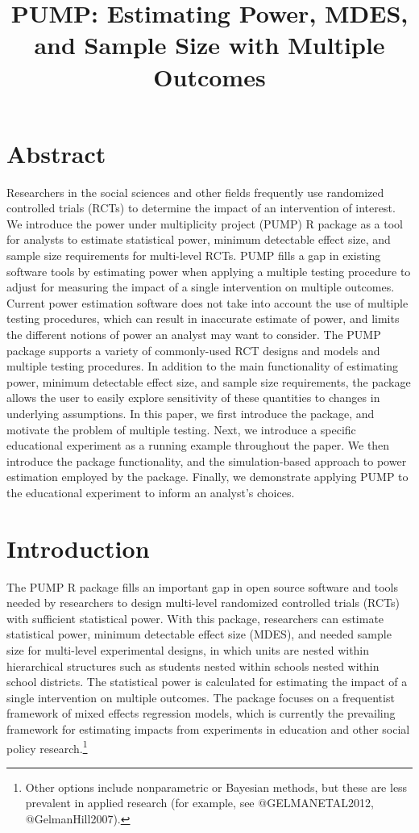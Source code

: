 \documentclass[
]{article}
\title{PUMP: Estimating Power, MDES, and Sample Size with Multiple
Outcomes}
\author{}
\date{\vspace{-2.5em}}
\begin{document}
\maketitle

\doublespacing

\section*{Abstract}

Researchers in the social sciences and other fields frequently use
randomized controlled trials (RCTs) to determine the impact of an
intervention of interest. We introduce the power under multiplicity
project (PUMP) R package as a tool for analysts to estimate statistical
power, minimum detectable effect size, and sample size requirements for
multi-level RCTs. PUMP fills a gap in existing software tools by
estimating power when applying a multiple testing procedure to adjust
for measuring the impact of a single intervention on multiple outcomes.
Current power estimation software does not take into account the use of
multiple testing procedures, which can result in inaccurate estimate of
power, and limits the different notions of power an analyst may want to
consider. The PUMP package supports a variety of commonly-used RCT
designs and models and multiple testing procedures. In addition to the
main functionality of estimating power, minimum detectable effect size,
and sample size requirements, the package allows the user to easily
explore sensitivity of these quantities to changes in underlying
assumptions. In this paper, we first introduce the package, and motivate
the problem of multiple testing. Next, we introduce a specific
educational experiment as a running example throughout the paper. We
then introduce the package functionality, and the simulation-based
approach to power estimation employed by the package. Finally, we
demonstrate applying PUMP to the educational experiment to inform an
analyst's choices.

\section{Introduction}
\label{sec:intro}

The PUMP R package fills an important gap in open source software and
tools needed by researchers to design multi-level randomized controlled
trials (RCTs) with sufficient statistical power. With this package,
researchers can estimate statistical power, minimum detectable effect
size (MDES), and needed sample size for multi-level experimental
designs, in which units are nested within hierarchical structures such
as students nested within schools nested within school districts. The
statistical power is calculated for estimating the impact of a single
intervention on multiple outcomes. The package focuses on a frequentist
framework of mixed effects regression models, which is currently the
prevailing framework for estimating impacts from experiments in
education and other social policy
research.\footnote{Other options include nonparametric or Bayesian methods, but these are less prevalent in applied research (for example, see @GELMANETAL2012, @GelmanHill2007).}
\end{document}
